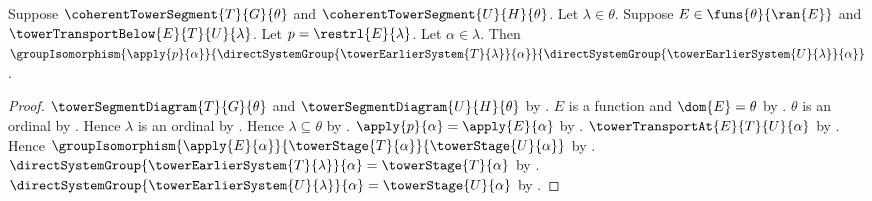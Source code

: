 \begin{proposition}\label{tower_transport_restriction_component}
    Suppose $\coherentTowerSegment{T}{G}{\theta}$ and
        $\coherentTowerSegment{U}{H}{\theta}$.
    Let $\lambda\in\theta$.
    Suppose $E\in\funs{\theta}{\ran{E}}$ and
        $\towerTransportBelow{E}{T}{U}{\lambda}$.
    Let $p=\restrl{E}{\lambda}$.
    Let $\alpha\in\lambda$.
    Then $\groupIsomorphism{\apply{p}{\alpha}}
        {\directSystemGroup{\towerEarlierSystem{T}{\lambda}}{\alpha}}
        {\directSystemGroup{\towerEarlierSystem{U}{\lambda}}{\alpha}}$.
\end{proposition}
\begin{proof}
    $\towerSegmentDiagram{T}{G}{\theta}$ and
        $\towerSegmentDiagram{U}{H}{\theta}$ by
        .
    $E$ is a function and $\dom{E}=\theta$ by
        .
    $\theta$ is an ordinal by
        .
    Hence $\lambda$ is an ordinal by
        .
    Hence $\lambda\subseteq\theta$ by
        .
    $\apply{p}{\alpha}=\apply{E}{\alpha}$ by
        .
    $\towerTransportAt{E}{T}{U}{\alpha}$ by
        .
    Hence $\groupIsomorphism{\apply{E}{\alpha}}
        {\towerStage{T}{\alpha}}{\towerStage{U}{\alpha}}$ by
        .
    $\directSystemGroup{\towerEarlierSystem{T}{\lambda}}{\alpha}=
        \towerStage{T}{\alpha}$ by
        .
    $\directSystemGroup{\towerEarlierSystem{U}{\lambda}}{\alpha}=
        \towerStage{U}{\alpha}$ by
        .
\end{proof}

